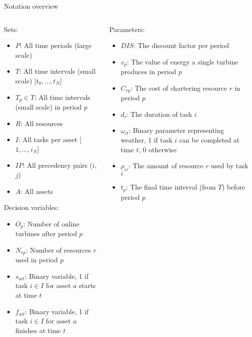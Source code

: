 \documentclass{beamer}
\begin{document}
\begin{frame}{Notation overview}
\scriptsize

\begin{columns}
\begin{column}{.48\textwidth}
Sets:
\begin{itemize}
\item $P$: All time periods (large scale)
\item $T$: All time intervals (small scale) [$t_0, \dots , t_N$]
\item $T_p \in T$: All time intervals (small scale) in period $p$
\item $R$: All resources
\item $I$:  All tasks per asset [$1, \dots , i_N$]
\item $IP$: All precedency pairs ($i$, $j$)
\item $A$: All assets
\end{itemize}

Decision variables:
\begin{itemize}
\item $O_{p}$: Number of online turbines after period $p$
\item $N_{rp}$: Number of resources $r$ used in period $p$
\item $s_{ait}$: Binary variable, 1 if task $i \in I$ for asset $a$ starts at time $t$
\item $f_{ait}$: Binary variable, 1 if task $i \in I$ for asset $a$ finishes at time $t$
\end{itemize}
\end{column}

\hfill

\begin{column}{.48\textwidth}
Parameters:
\begin{itemize}
\item $DIS$: The discount factor per period
\item $v_p$: The value of energy a single turbine produces in period $p$
\item $C_{rp}$: The cost of chartering resource $r$ in period $p$
\item $d_i$: The duration of task $i$
\item $\omega_{it}$: Binary parameter representing weather, 1 if task $i$ can be completed at time $t$, 0 otherwise
\item $\rho_{ir}$: The amount of resource $r$ used by task $i$
\item $t_p$: The final time interval (from $T$) before period $p$
\end{itemize}
\end{column}
\end{columns}

\end{frame}
\end{document}
